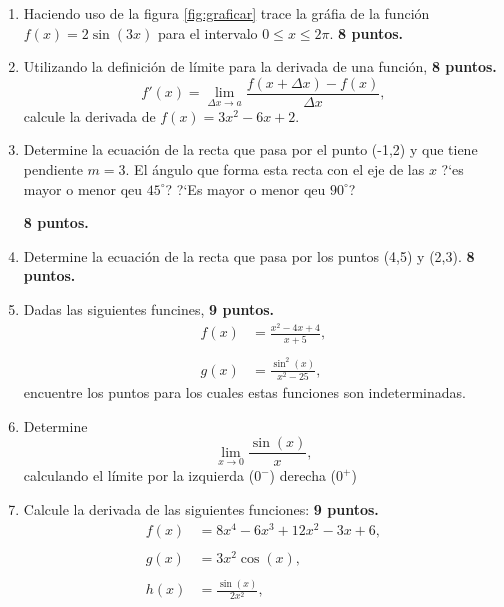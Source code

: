 \documentclass[]{article}
\begin{document}
\begin{enumerate}
\item Haciendo uso de la figura \ref{fig:graficar} trace la gr\'afia de la
funci\'on $f(x) = 2 \sin (3x)$ para el intervalo $0 \leq x \leq 2\pi$.
\hfill \textbf{8 puntos.}



\item Utilizando la definici\'on de l\'imite para la derivada de una funci\'on,
\hfill \textbf{8 puntos.}
\begin{equation*}
f'(x) = \lim_{\Delta x \to a} \frac{f(x + \Delta x) - f(x)}{\Delta x},
\end{equation*}
calcule la derivada de $f(x)= 3x^{2} - 6x + 2 $.

\item Determine la ecuaci\'on de la recta que pasa por el punto (-1,2) y que
tiene pendiente $m=3$. El \'angulo que forma esta recta con el eje de las $x$
?`es mayor o menor qeu $45^{\circ}$? ?`Es mayor o menor qeu $90^{\circ}$?

\hfill \textbf{8 puntos.}

\item Determine la ecuaci\'on de la recta que pasa por los puntos (4,5) y (2,3).
\hfill \textbf{8 puntos.}


\item Dadas las siguientes funcines, 
\hfill \textbf{9 puntos.}
\begin{align}
f(x) &= \frac{x^{2} - 4x  + 4 }{x+5}, \\ \nonumber \\
g(x) &= \frac{\sin^{2}(x)}{x^{2}-25},
\end{align}
\setcounter{equation}{0}
encuentre los puntos para los cuales estas funciones son indeterminadas.
\item Determine  
\begin{equation*}
\lim_{x \to 0} \frac{\sin(x)}{x},
\end{equation*} 
calculando el l\'imite por la izquierda ($0^{-}$) derecha
($0^{+}$)

\item Calcule la derivada de las siguientes funciones:
\hfill \textbf{9 puntos.}
\begin{align}
f(x) &= 8x^{4} - 6x^{3} + 12x^{2} -3x +6, \\ \nonumber \\
g(x) &= 3x^{2}\cos(x), \\ \nonumber \\
h(x) &= \frac{\sin(x)}{2x^2}, \\ \nonumber 
\end{align}
\end{enumerate}
\setcounter{equation}{0}
\end{document}
